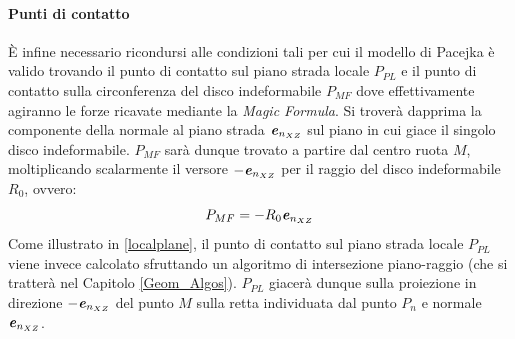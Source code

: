 \paragraph{Punti di contatto}
\label{Punti_contatto_rill}
È infine necessario ricondursi alle condizioni tali per cui il modello di Pacejka è valido trovando il punto di contatto sul piano strada locale $P_{PL}$ e il punto di contatto sulla circonferenza del disco indeformabile $P_{MF}$ dove effettivamente agiranno le forze ricavate mediante la \textit{Magic Formula}. Si troverà dapprima la componente della normale al piano strada $\textbf{\textit{e}}_{n_{XZ}}$ sul piano in cui giace il singolo disco indeformabile. $P_{MF}$ sarà dunque trovato a partire dal centro ruota $M$, moltiplicando scalarmente il versore $-\textbf{\textit{e}}_{n_{XZ}}$ per il raggio del disco indeformabile $R_0$, ovvero:
%
\begin{equation}
P_{MF} = -R_0\textbf{\textit{e}}_{n_{XZ}}
\label{puntoMF}
\end{equation}
%
Come illustrato in \figurename{ \ref{localplane}}, il punto di contatto sul piano strada locale $P_{PL}$ viene invece calcolato sfruttando un algoritmo di intersezione piano-raggio (che si tratterà nel Capitolo \ref{Geom_Algos}). $P_{PL}$ giacerà dunque sulla proiezione in direzione $-\textbf{\textit{e}}_{n_{XZ}}$ del punto $M$ sulla retta individuata dal punto $P_n$ e normale $\textbf{\textit{e}}_{n_{XZ}}$.

